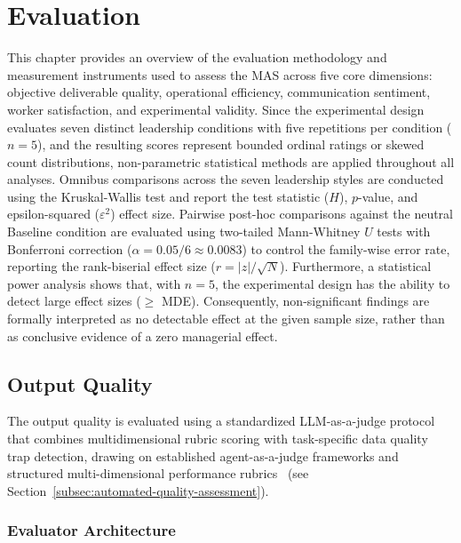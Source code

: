 \chapter{Evaluation}
\label{chap:evaluation}

This chapter provides an overview of the evaluation methodology and measurement instruments used to assess the \ac{MAS} across five core dimensions: objective deliverable quality, operational efficiency, communication sentiment, worker satisfaction, and experimental validity.
Since the experimental design evaluates seven distinct leadership conditions with five repetitions per condition ($n=5$), and the resulting scores represent bounded ordinal ratings or skewed count distributions, non-parametric statistical methods are applied throughout all analyses.
Omnibus comparisons across the seven leadership styles are conducted using the Kruskal-Wallis test and report the test statistic ($H$), $p$-value, and epsilon-squared ($\varepsilon^2$) effect size.
Pairwise post-hoc comparisons against the neutral Baseline condition are evaluated using two-tailed Mann-Whitney $U$ tests with Bonferroni correction ($\alpha = 0.05 / 6 \approx 0.0083$) to control the family-wise error rate, reporting the rank-biserial effect size ($r = |z| / \sqrt{N}$).
Furthermore, a statistical power analysis shows that, with $n=5$, the experimental design has the ability to detect large effect sizes ($\ge$ \ac{MDE}). 
Consequently, non-significant findings are formally interpreted as no detectable effect at the given sample size, rather than as conclusive evidence of a zero managerial effect.

\section{Output Quality}
\label{sec:eval-output-quality}

The output quality is evaluated using a standardized \ac{LLM}-as-a-judge protocol that combines multidimensional rubric scoring with task-specific data quality trap detection, drawing on established agent-as-a-judge frameworks and structured multi-dimensional performance rubrics~\cite{chen2025multiagentasjudgealigningllmagentbasedautomated, samuel2025personagymevaluatingpersonaagents, zheng2023judgingllmasajudgemtbenchchatbot} (see Section~\ref{subsec:automated-quality-assessment}).

\subsection{Evaluator Architecture}
\label{subsec:evaluator-architecture}

